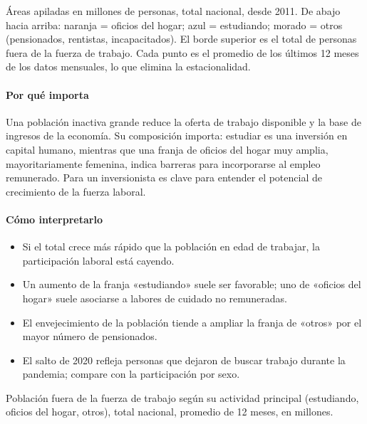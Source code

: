 \begin{leer}
Áreas apiladas en millones de personas, total nacional, desde 2011. De abajo hacia arriba: naranja = oficios del hogar; azul = estudiando; morado = otros (pensionados, rentistas, incapacitados). El borde superior es el total de personas fuera de la fuerza de trabajo. Cada punto es el promedio de los últimos 12 meses de los datos mensuales, lo que elimina la estacionalidad.
\end{leer}

\paragraph{Por qué importa}
Una población inactiva grande reduce la oferta de trabajo disponible y la base de ingresos de la economía. Su composición importa: estudiar es una inversión en capital humano, mientras que una franja de oficios del hogar muy amplia, mayoritariamente femenina, indica barreras para incorporarse al empleo remunerado. Para un inversionista es clave para entender el potencial de crecimiento de la fuerza laboral.

\paragraph{Cómo interpretarlo}
\begin{itemize}
\item Si el total crece más rápido que la población en edad de trabajar, la participación laboral está cayendo.
\item Un aumento de la franja «estudiando» suele ser favorable; uno de «oficios del hogar» suele asociarse a labores de cuidado no remuneradas.
\item El envejecimiento de la población tiende a ampliar la franja de «otros» por el mayor número de pensionados.
\item El salto de 2020 refleja personas que dejaron de buscar trabajo durante la pandemia; compare con la participación por sexo.
\end{itemize}
\begin{formulas}[Fórmulas]
\end{formulas}
\begin{metodo}[Metodología]
Población fuera de la fuerza de trabajo según su actividad principal (estudiando, oficios del hogar, otros), total nacional, promedio de 12 meses, en millones.
\par{}
\end{metodo}

